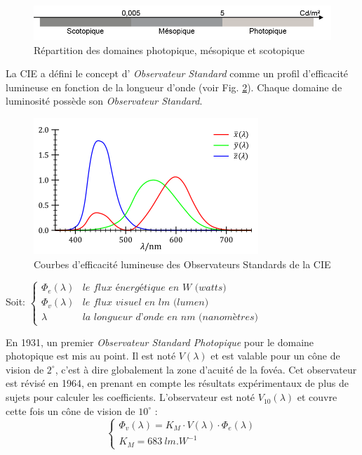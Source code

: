 	\begin{figure}[h]
		\centering
		\includegraphics[scale=1]{Figures/PhotopiqueMesopiqueScotopique}
		\caption{Répartition des domaines photopique, mésopique et scotopique}
		\label{fig:photopic_mesopic_scotopic}
	\end{figure}		
	
	\par La CIE a défini le concept d' \textit{Observateur Standard} comme un profil d'efficacité lumineuse en fonction de la longueur d'onde (voir Fig. \ref{fig:standard_observer_curves}). Chaque domaine de luminosité possède son \textit{Observateur Standard}.
	
	\begin{figure}[h]
		\centering
		\includegraphics[scale=1]{Figures/StandardObsCurves}
		\caption{Courbes d'efficacité lumineuse des Observateurs Standards de la CIE}
		\label{fig:standard_observer_curves}
	\end{figure}
	
	\par Soit: $\begin{cases}
	\Phi_e(\lambda) & \textit{le flux énergétique en W (watts)}\\
	\Phi_v(\lambda) & \textit{le flux visuel en lm (lumen)}\\
	\lambda & \textit{la longueur d'onde en nm (nanomètres)}
	\end{cases}$
	
	\par En 1931, un premier \textit{Observateur Standard Photopique} pour le domaine photopique est mis au point. Il est noté $V(\lambda)$ et est valable pour un cône de vision de $2^\circ$, c'est à dire globalement la zone d'acuité de la fovéa. Cet observateur est révisé en 1964, en prenant en compte les résultats expérimentaux de plus de sujets pour calculer les coefficients. L'observateur est noté $V_{10}(\lambda)$ et couvre cette fois un cône de vision de $10^\circ$ \citep{le_grand_optique_1972, damelincourt_eclairage_2010}:
	\begin{equation}
		\begin{cases}
		\Phi_v(\lambda) = K_M \cdot V(\lambda) \cdot \Phi_e(\lambda)\\
		K_M = 683~lm.W^{-1}
		\end{cases}
		\label{eq:obs_photopic}
	\end{equation}
	
